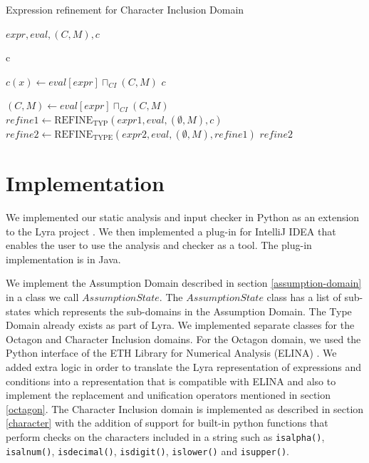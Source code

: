 \documentclass[10pt]{report}
\begin{document}
\begin{algorithm}[H]
	\caption{Expression refinement for Character Inclusion Domain} \label{refineC}
	\begin{algorithmic}
		 {$ expr, eval, (C, M), c$}
		
		\State \Return c
		\EndIf
		
		\State $ c(x) \gets eval[expr] \sqcap_{CI} (C, M)$
		\State \Return $ c $
		\EndIf
		
		\State $ (C, M) \gets eval[expr] \sqcap_{CI} (C, M)  $
		\State $ refine1 \gets \mathrm{REFINE}_{\mathrm{TYP}}(expr1, eval, (\emptyset, M), c) $
		\State $ refine2 \gets \mathrm{REFINE}_{\mathrm{TYPE}}(expr2, eval, (\emptyset, M), refine1) $
		\State \Return $ refine2 $
		\EndIf
		
		\EndFunction
	\end{algorithmic}
\end{algorithm}


\chapter{Implementation} \label{implementation}

We implemented our static analysis and input checker in Python as an extension to the Lyra project \cite{lyra}. We then implemented a plug-in for IntelliJ IDEA that enables the user to use the analysis and checker as a tool. The plug-in implementation is in Java. 



We implement the Assumption Domain described in section \ref{assumption-domain} in a class we call $ AssumptionState $.  The $ AssumptionState $ class has a list of sub-states which represents the sub-domains in the Assumption Domain. The Type Domain already exists as part of Lyra. We implemented separate classes for the Octagon and Character Inclusion domains. For the Octagon domain, we used the Python interface of the ETH Library for Numerical Analysis (ELINA) \cite{singh}. We added extra logic in order to translate the Lyra representation of expressions and conditions into a representation that is compatible with ELINA and also to implement the replacement and unification operators mentioned in section \ref{octagon}. The Character Inclusion domain is implemented as described in section \ref{character} with the addition of support for built-in python functions that perform checks on the characters included in a string such as \verb|isalpha()|, \verb|isalnum()|, \verb|isdecimal()|, \verb|isdigit()|, \verb|islower()| and \verb|isupper()|. 
\end{document}
